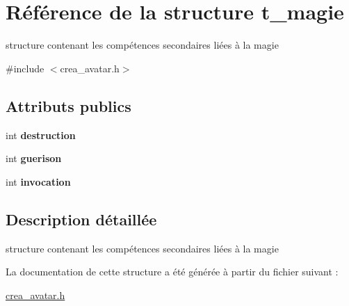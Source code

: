 \hypertarget{structt__magie}{\section{Référence de la structure t\-\_\-magie}
\label{structt__magie}
}


structure contenant les compétences secondaires liées à la magie  




{\ttfamily \#include $<$crea\-\_\-avatar.\-h$>$}

\subsection*{Attributs publics}
\begin{DoxyCompactItemize}
\item 
\hypertarget{structt__magie_a748f9899a3639a5998a908f43ab8ccc6}{int {\bfseries destruction}}\label{structt__magie_a748f9899a3639a5998a908f43ab8ccc6}

\item 
\hypertarget{structt__magie_a45be509fa54809012428067749f79718}{int {\bfseries guerison}}\label{structt__magie_a45be509fa54809012428067749f79718}

\item 
\hypertarget{structt__magie_add708cc57b12591b70f75b2d3ed62f07}{int {\bfseries invocation}}\label{structt__magie_add708cc57b12591b70f75b2d3ed62f07}

\end{DoxyCompactItemize}


\subsection{Description détaillée}
structure contenant les compétences secondaires liées à la magie 

La documentation de cette structure a été générée à partir du fichier suivant \-:\begin{DoxyCompactItemize}
\item 
\hyperlink{crea__avatar_8h}{crea\-\_\-avatar.\-h}\end{DoxyCompactItemize}

